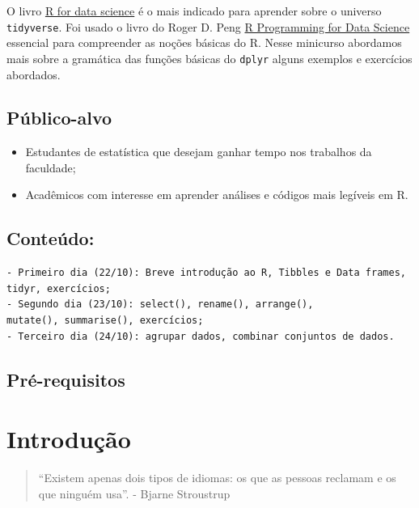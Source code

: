 \documentclass[]{book}
\providecommand{\tightlist}{%
  \setlength{\itemsep}{0pt}\setlength{\parskip}{0pt}}
\begin{document}
O livro \href{https://r4ds.had.co.nz/}{R for data science} é o mais indicado para aprender sobre o universo \texttt{tidyverse}. Foi usado o livro do Roger D. Peng \href{https://bookdown.org/rdpeng/rprogdatascience/}{R Programming for Data Science} essencial para compreender as noções básicas do R. Nesse minicurso abordamos mais sobre a gramática das funções básicas do \texttt{dplyr} alguns exemplos e exercícios abordados.

\hypertarget{publico-alvo}{%
\section{Público-alvo}\label{publico-alvo}}

\begin{itemize}
\tightlist
\item
  Estudantes de estatística que desejam ganhar tempo nos trabalhos da faculdade;
\item
  Acadêmicos com interesse em aprender análises e códigos mais legíveis em R.
\end{itemize}

\hypertarget{conteudo}{%
\section{Conteúdo:}\label{conteudo}}

\begin{verbatim}
- Primeiro dia (22/10): Breve introdução ao R, Tibbles e Data frames,
tidyr, exercícios; 
- Segundo dia (23/10): select(), rename(), arrange(), 
mutate(), summarise(), exercícios;
- Terceiro dia (24/10): agrupar dados, combinar conjuntos de dados.
\end{verbatim}

\hypertarget{pre-requisitos}{%
\section{Pré-requisitos}\label{pre-requisitos}}

\hypertarget{intro}{%
\chapter{Introdução}\label{intro}}

\begin{quote}
``Existem apenas dois tipos de idiomas: os que as pessoas reclamam e os que ninguém usa''. - Bjarne Stroustrup
\end{quote}
\end{document}

